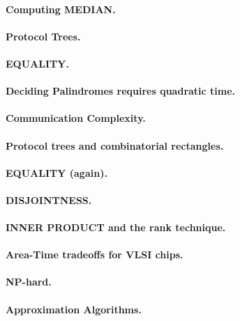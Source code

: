 \documentclass[11pt,a4paper]{article}
\theoremstyle{definition}
\begin{document}
\paragraph{Computing MEDIAN.}

\paragraph{Protocol Trees.}
\paragraph{EQUALITY.}

\paragraph{Deciding Palindromes requires quadratic time.}

\paragraph{Communication Complexity.}

\paragraph{Protocol trees and combinatorial rectangles.}

\paragraph{EQUALITY (again).}

\paragraph{DISJOINTNESS.}

\paragraph{INNER PRODUCT and the rank technique.}

\paragraph{Area-Time tradeoffs for VLSI chips.}

\paragraph{NP-hard.}

\paragraph{Approximation Algorithms.}
\end{document}
